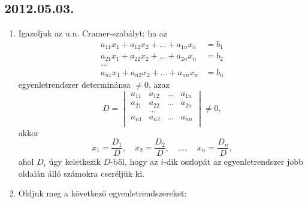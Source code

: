 \subsection*{2012.05.03.}
\begin{enumerate}
\item Igazoljuk az u.n. Cramer-szabályt: ha az
\begin{align*}
a_{11}x_1+a_{12}x_2+\ldots+a_{1n}x_n&=b_1\\
a_{21}x_1+a_{22}x_2+\ldots+a_{2n}x_n&=b_2\\
\ldots\\
a_{n1}x_1+a_{n2}x_2+\ldots+a_{nn}x_n&=b_n
\end{align*}
egyenletrendszer determinánsa $\ne 0$, azaz
$$D=\begin{vmatrix}
a_{11}&a_{12}&\ldots&a_{1n}\\
a_{21}&a_{22}&\ldots&a_{2n}\\
&\ldots&&\\
a_{n1}&a_{n2}&\ldots&a_{nn}\\
\end{vmatrix}\ne 0,$$
akkor
$$
x_1=\frac{D_1}{D},\quad
x_2=\frac{D_2}{D},\quad
\ldots,\quad
x_n=\frac{D_n}{D},
$$
ahol $D_i$ úgy keletkezik $D$-ből, hogy az $i$-dik oszlopát az egyenletrendszer jobb oldalán álló számokra cseréljük ki.
\item Oldjuk meg a következő egyenletrendszereket:
\end{enumerate}


